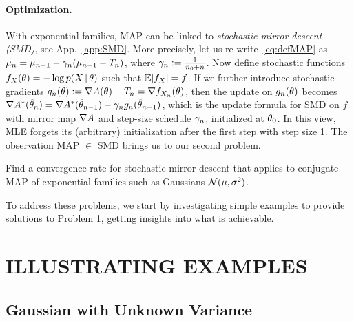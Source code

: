 \paragraph{Optimization.}
With exponential families, MAP can be linked to \emph{stochastic mirror descent (SMD)}, see App.~\ref{app:SMD}.
More precisely, let us re-write~\eqref{eq:defMAP} as $\mu_n = \mu_{n-1}- \gamma_n (\mu_{n-1} - T_n)$, where $\gamma_n := \frac{1}{n_0 + n}$. Now define stochastic functions $f_X(\theta) = -\log p(X \,\vert\, \theta)$ such that $\operatorname{\mathbb{E}}[f_X] = f$.
If we further introduce stochastic gradients $g_n(\theta) := \nabla A(\theta) - T_n = \nabla f_{X_n}(\theta)$, then the update on $g_n(\theta)$ becomes $\nabla{A^*}(\hat {\theta}_{n})= \nabla{A^*}(\hat {\theta}_{n-1}) - \gamma_n g_n(\hat {\theta}_{n-1})$, which is the update formula for SMD on $f$ with mirror map $\nabla A$
and step-size schedule $\gamma_n$, initialized at $\theta_0$.
In this view, MLE forgets its (arbitrary) initialization after the first step with step size 1.
The observation MAP $\in$ SMD brings us to our second problem.
\begin{problem}
Find a convergence rate for stochastic mirror descent that applies to conjugate MAP of exponential families such as Gaussians ${\mathcal N}(\mu, \sigma^2)$.
\end{problem}

To address these problems, we start by investigating simple examples to provide solutions to Problem 1, getting insights into what is achievable.

\section{ILLUSTRATING EXAMPLES}\label{sec:example}
\subsection{Gaussian with Unknown Variance}\label{ssec:gaussian-variance}

